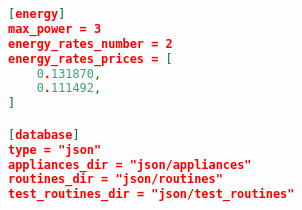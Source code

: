 \begin{lstlisting}[language=json,caption={Example of a configuration file.},label=code:configuration,float,floatplacement=H]
[energy]
max_power = 3
energy_rates_number = 2
energy_rates_prices = [
    0.131870,
    0.111492,
]

[database]
type = "json"
appliances_dir = "json/appliances"
routines_dir = "json/routines"
test_routines_dir = "json/test_routines"
\end{lstlisting}